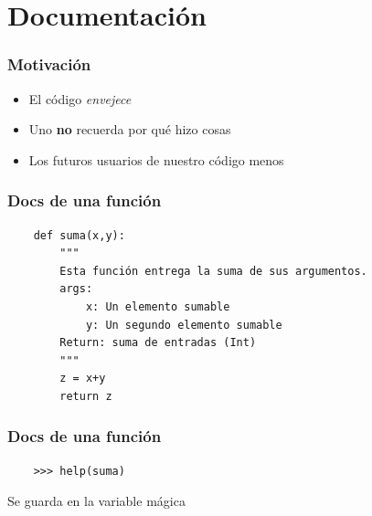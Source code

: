 \documentclass[14pt,aspectratio=169,xcolor=dvipsnames]{beamer}
\begin{document}
\begin{frame}
    \maketitle
\end{frame}
\section{Documentación}
\begin{frame}\frametitle{Motivación}
    \begin{itemize}
        \item El código \emph{envejece}
        \item Uno \textbf{no} recuerda por qué hizo cosas
        \item Los futuros usuarios de nuestro código \huge{menos}
    \end{itemize}
\end{frame}
\begin{frame}[fragile]\frametitle{Docs de una función}
    \begin{verbatim}
    def suma(x,y):
        """
        Esta función entrega la suma de sus argumentos. 
        args: 
            x: Un elemento sumable
            y: Un segundo elemento sumable
        Return: suma de entradas (Int)
        """
        z = x+y
        return z
    \end{verbatim}
\end{frame}
\begin{frame}[fragile]\frametitle{Docs de una función}
    \begin{verbatim}
    >>> help(suma)
    \end{verbatim}

    \vspace{1cm}
    Se guarda en la variable mágica 

\end{frame}
\end{document}
